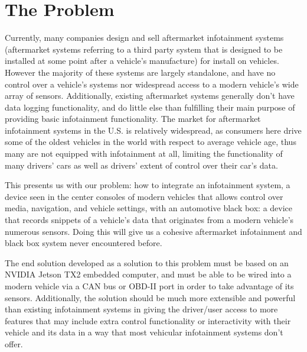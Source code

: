 \documentclass[onecolumn, draftclsnofoot,10pt, compsoc]{IEEEtran}
\begin{document}
\section{The Problem}
Currently, many companies design and sell aftermarket infotainment systems (aftermarket systems referring to a third party system that is designed to be installed at some point after a vehicle's manufacture) for install on vehicles. However the majority of these systems are largely standalone, and have no control over a vehicle's systems nor widespread access to a modern vehicle's wide array of sensors. Additionally, existing aftermarket systems generally don't have data logging functionality, and do little else than fulfilling their main purpose of providing basic infotainment functionality. The market for aftermarket infotainment systems in the U.S. is relatively widespread, as consumers here drive some of the oldest vehicles in the world with respect to average vehicle age, thus many are not equipped with infotainment at all, limiting the functionality of many drivers' cars as well as drivers' extent of control over their car's data.\par
This presents us with our problem: how to integrate an infotainment system, a device seen in the center consoles of modern vehicles that allows control over media, navigation, and vehicle settings, with an automotive black box: a device that records snippets of a vehicle's data that originates from a modern vehicle's numerous sensors. Doing this will give us a cohesive aftermarket infotainment and black box system never encountered before.\par
The end solution developed as a solution to this problem must be based on an NVIDIA Jetson TX2 embedded computer, and must be able to be wired into a modern vehicle via a CAN bus or OBD-II port in order to take advantage of its sensors. Additionally, the solution should be much more extensible and powerful than existing infotainment systems in giving the driver/user access to more features that may include extra control functionality or interactivity with their vehicle and its data in a way that most vehicular infotainment systems don't offer.\par
\end{document}
